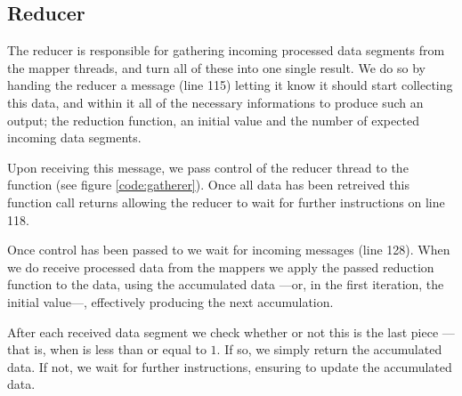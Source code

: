 \subsection{Reducer}
The reducer is responsible for gathering incoming processed data segments from
the mapper threads, and turn all of these into one single result. We do so by
handing the reducer a message (line 115) letting it know it should start
collecting this data, and within it all of the necessary informations to
produce such an output; the reduction function, an initial value and the
number of expected incoming data segments.

Upon receiving this message, we pass control of the reducer thread to the
 function (see figure \ref{code:gatherer}).
Once all data has been retreived this function call returns allowing the
reducer to wait for further instructions on line 118.


Once control has been passed to  we wait for
incoming  messages (line 128). When we do receive processed data
from the mappers we apply the passed reduction function to the data, using the
accumulated data ---or, in the first iteration, the initial value---,
effectively producing the next accumulation.


After each received data segment we check whether or not this is the last
piece --- that is, when  is less than or equal to $1$. If so, we
simply return the accumulated data. If not, we wait for further instructions,
ensuring to update the accumulated data.

